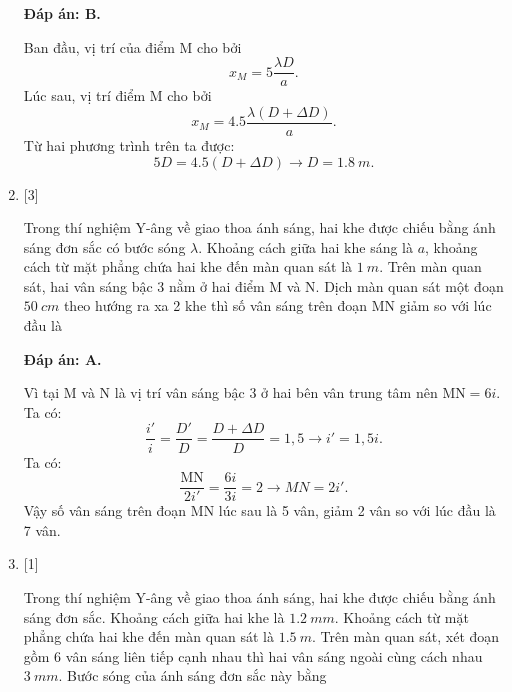 \begin{enumerate}[label=\bfseries Câu \arabic*:]
	\loigiai
	{		\textbf{Đáp án: B.}
		
		Ban đầu, vị trí của điểm M cho bởi
		$$
		x_{M} = 5 \dfrac{\lambda D}{a}.
		$$
		Lúc sau, vị trí điểm M cho bởi
		$$
		x_{M} = \num{4,5} \dfrac{\lambda (D + \Delta D)}{a}.
		$$
		Từ hai phương trình trên ta được:
		$$
		5D = \num{4,5}(D + \Delta D) \rightarrow D = \SI{1,8}{m}.
		$$
	}
	
	
	\item {} [3]
	\cauhoi
	{Trong thí nghiệm Y-âng về giao thoa ánh sáng, hai khe được chiếu bằng ánh sáng đơn sắc có bước sóng $\lambda$. Khoảng cách giữa hai khe sáng là $a$, khoảng cách từ mặt phẳng chứa hai khe đến màn quan sát là $\SI{1}{m}$. Trên màn quan sát, hai vân sáng bậc 3 nằm ở hai điểm M và N. Dịch màn quan sát một đoạn $\SI{50}{cm}$ theo hướng ra xa 2 khe thì số vân sáng trên đoạn MN giảm so với lúc đầu là 
	}
	
	\loigiai
	{		\textbf{Đáp án: A.}
		
		Vì tại M và N là vị trí vân sáng bậc 3 ở hai bên vân trung tâm nên $\text{MN} = 6i$.
		Ta có:
		$$
		\dfrac{i'}{i} = \dfrac{D'}{D} = \dfrac{D + \Delta D}{D} = 1,5 \rightarrow i' = 1,5i.
		$$
		Ta có:
		$$
		\dfrac{\text{MN}}{2i'} = \dfrac{6i}{3i} = 2 \rightarrow MN = 2i'.
		$$
		Vậy số vân sáng trên đoạn MN lúc sau là 5 vân, giảm 2 vân so với lúc đầu là 7 vân.
	}
	
	\item {} [1]
	\cauhoi
	{Trong thí nghiệm Y-âng về giao thoa ánh sáng, hai khe được chiếu bằng ánh sáng đơn sắc. Khoảng cách giữa hai khe là $\SI{1,2}{mm}$. Khoảng cách từ mặt phẳng chứa hai khe đến màn quan sát là $\SI{1,5}{m}$. Trên màn quan sát, xét đoạn gồm 6 vân sáng liên tiếp cạnh nhau thì hai vân sáng ngoài cùng cách nhau $\SI{3}{mm}$. Bước sóng của ánh sáng đơn sắc này bằng
	}
	

\end{enumerate}
